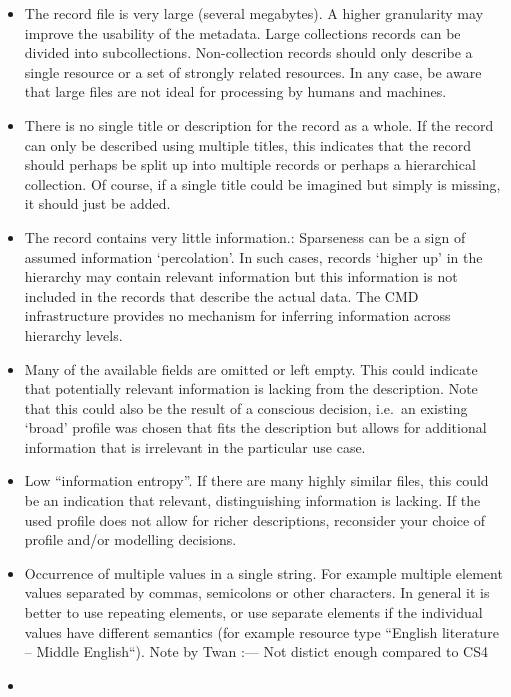 \documentclass[]{article}
\providecommand{\tightlist}{%
  \setlength{\itemsep}{0pt}\setlength{\parskip}{0pt}}
\begin{document}
\begin{itemize}
\tightlist
\item
  The record file is very large (several megabytes). A higher
  granularity may improve the usability of the metadata. Large
  collections records can be divided into subcollections. Non-collection
  records should only describe a single resource or a set of strongly
  related resources. In any case, be aware that large files are not
  ideal for processing by humans and machines.
\item
  There is no single title or description for the record as a whole. If
  the record can only be described using multiple titles, this indicates
  that the record should perhaps be split up into multiple records or
  perhaps a hierarchical collection. Of course, if a single title could
  be imagined but simply is missing, it should just be added.
\item
  The record contains very little information.: Sparseness can be a sign
  of assumed information `percolation'. In such cases, records `higher
  up' in the hierarchy may contain relevant information but this
  information is not included in the records that describe the actual
  data. The CMD infrastructure provides no mechanism for inferring
  information across hierarchy levels.
\item
  Many of the available fields are omitted or left empty. This could
  indicate that potentially relevant information is lacking from the
  description. Note that this could also be the result of a conscious
  decision, i.e.~an existing `broad' profile was chosen that fits the
  description but allows for additional information that is irrelevant
  in the particular use case.
\item
  Low ``information entropy''. If there are many highly similar files,
  this could be an indication that relevant, distinguishing information
  is lacking. If the used profile does not allow for richer
  descriptions, reconsider your choice of profile and/or modelling
  decisions.
\item
  Occurrence of multiple values in a single string. For example multiple
  element values separated by commas, semicolons or other characters. In
  general it is better to use repeating elements, or use separate
  elements if the individual values have different semantics (for
  example resource type ``English literature -- Middle English``).
  \textbar{} Note by Twan \textbar{} \textbar{} :--- \textbar{}
  \textbar{} Not distict enough compared to CS4 \textbar{}
\item

\end{itemize}
\end{document}
